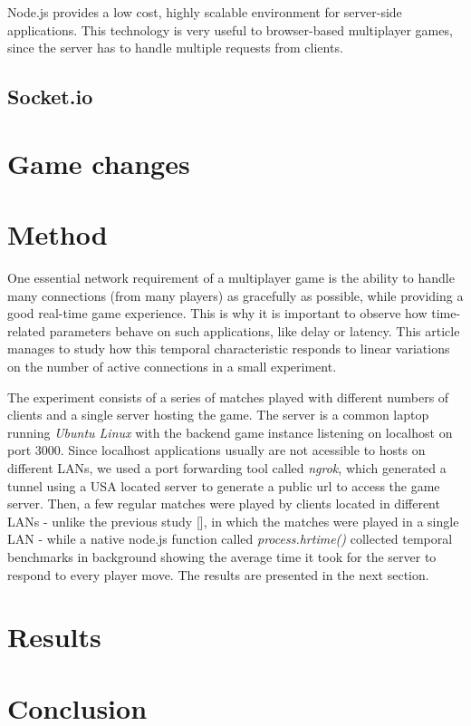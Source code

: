 \documentclass[english]{sbrt}
\begin{document}
Node.js provides a low cost, highly scalable environment for server-side applications. This technology is very useful to browser-based multiplayer games, since the server has to handle multiple requests from clients.

\subsection{\textbf{Socket.io}}


\section{\textbf{Game changes}}

\section{\textbf{Method}}

One essential network requirement of a multiplayer game is the ability to handle many connections (from many players) as gracefully as possible, while providing a good real-time game experience. This is why it is important to observe how time-related parameters behave on such applications, like delay or latency. This article manages to study how this temporal characteristic responds to linear variations on the number of active connections in a small experiment.

The experiment consists of a series of matches played with different numbers of clients and a single server hosting the game.
The server is a common laptop running \textit{Ubuntu Linux} with the backend game instance listening on localhost on port 3000. Since localhost applications usually are not acessible to hosts on different LANs, we used a port forwarding tool called \textit{ngrok}, which generated a tunnel using a USA located server to generate a public url to access the game server. Then, a few regular matches were played by clients located in different LANs - unlike the previous study [], in which the matches were played in a single LAN - while a native node.js function called \textit{process.hrtime()} collected temporal benchmarks in background showing the average time it took for the server to respond to every player move. The results are presented in the next section.

\section{\textbf{Results}}

\section{\textbf{Conclusion}}

\cite{chen2011framework}



\end{document}
